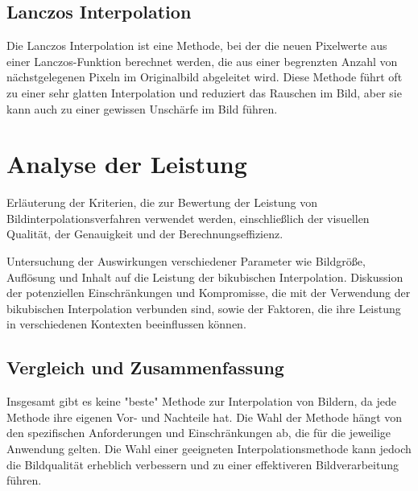 \subsection{Lanczos Interpolation}
Die Lanczos Interpolation ist eine Methode, bei der die neuen Pixelwerte aus einer Lanczos-Funktion berechnet werden, die aus einer begrenzten Anzahl von nächstgelegenen Pixeln im Originalbild abgeleitet wird. 
Diese Methode führt oft zu einer sehr glatten Interpolation und reduziert das Rauschen im Bild, aber sie kann auch zu einer gewissen Unschärfe im Bild führen.

\section{Analyse der Leistung}

    Erläuterung der Kriterien, die zur Bewertung der Leistung von Bildinterpolationsverfahren verwendet werden, einschließlich der visuellen Qualität, der Genauigkeit und der Berechnungseffizienz.

    Untersuchung der Auswirkungen verschiedener Parameter wie Bildgröße, Auflösung und Inhalt auf die Leistung der bikubischen Interpolation.
    Diskussion der potenziellen Einschränkungen und Kompromisse, die mit der Verwendung der bikubischen Interpolation verbunden sind, sowie der Faktoren, die ihre Leistung in verschiedenen Kontexten beeinflussen können.

\subsection{Vergleich und Zusammenfassung}

Insgesamt gibt es keine "beste" Methode zur Interpolation von Bildern, da jede Methode ihre eigenen Vor- und Nachteile hat. 
Die Wahl der Methode hängt von den spezifischen Anforderungen und Einschränkungen ab, die für die jeweilige Anwendung gelten. 
Die Wahl einer geeigneten Interpolationsmethode kann jedoch die Bildqualität erheblich verbessern und zu einer effektiveren Bildverarbeitung führen.
\newpage